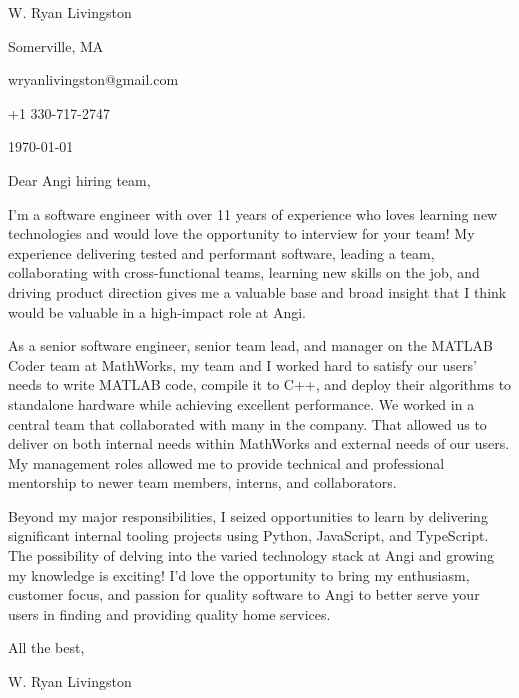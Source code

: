 \documentclass[
    10pt %
]{article}
\begin{document}
\begin{minipage}{\linewidth}
W. Ryan Livingston

Somerville, MA

wryanlivingston@gmail.com

+1 330-717-2747

\today
\end{minipage}


Dear Angi hiring team,

I'm a software engineer with over 11 years of experience who loves learning new technologies and would love the opportunity to interview for your team! My experience delivering tested and performant software, leading a team, collaborating with cross-functional teams, learning new skills on the job, and driving product direction gives me a valuable base and broad insight that I think would be valuable in a high-impact role at Angi.

As a senior software engineer, senior team lead, and manager on the MATLAB Coder team at MathWorks, my team and I worked hard to satisfy our users' needs to write MATLAB code, compile it to C++, and deploy their algorithms to standalone hardware while achieving excellent performance. We worked in a central team that collaborated with many in the company. That allowed us to deliver on both internal needs within MathWorks and external needs of our users. My management roles allowed me to provide technical and professional mentorship to newer team members, interns, and collaborators.

Beyond my major responsibilities, I seized opportunities to learn by delivering significant internal tooling projects using Python, JavaScript, and TypeScript. The possibility of delving into the varied technology stack at Angi and growing my knowledge is exciting! I'd love the opportunity to bring my enthusiasm, customer focus, and passion for quality software to Angi to better serve your users in finding and providing quality home services.

All the best,

W. Ryan Livingston
\end{document}

